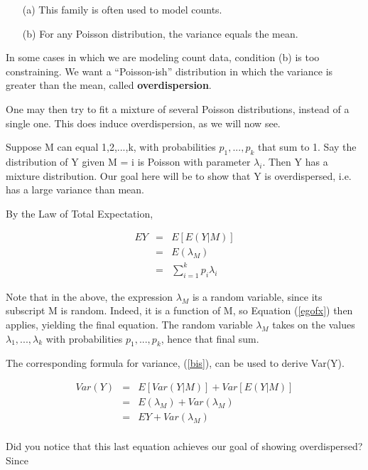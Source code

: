 \begin{itemize}

\item [(a)] This family is often used to model counts.

\item [(b)] For any Poisson distribution, the variance equals the mean.

\end{itemize}

In some cases in which we are modeling count data, condition (b) is too
constraining.  We want a ``Poisson-ish''
distribution in which the variance is greater
than the mean, called {\bf overdispersion}.  

One may then try to fit a mixture of several Poisson distributions,
instead of a single one.  This does induce overdispersion, as we will
now see.  

Suppose M can equal 1,2,...,k, with probabilities $p_1,...,p_k$ that sum
to 1.  Say the distribution of Y given M = i is Poisson with parameter
$\lambda_i$.  Then Y has a mixture distribution.  Our goal here will be
to show that Y is overdispersed, i.e. has a large variance than mean.

By the Law of Total Expectation,

\begin{eqnarray}
\label{meanlamb}
EY &=& E[E(Y|M)] \\ 
&=& E(\lambda_M) \label{elambm} \\
&=& \sum_{i=1}^k p_i \lambda_i
\end{eqnarray}

Note that in the above, the expression $\lambda_M$ is a random variable,
since its subscript M is random.  Indeed, it is a function of M, so
Equation (\ref{egofx}) then applies, yielding the final equation.  The
random variable $\lambda_M$ takes on the values $\lambda_1,...,\lambda_k$
with probabilities $p_1,...,p_k$, hence that final sum.

The corresponding formula for variance, (\ref{bis}), can be used to
derive Var(Y).

\begin{eqnarray}
Var(Y) &=& E[Var(Y|M)] + Var[E(Y|M)] \\ 
&=& E(\lambda_M) + Var(\lambda_M) \label{thislast} \\
&=& EY + Var(\lambda_M) \label{thislast} \\
\end{eqnarray}

Did you notice that this last equation achieves our goal of showing
overdispersed?  Since

